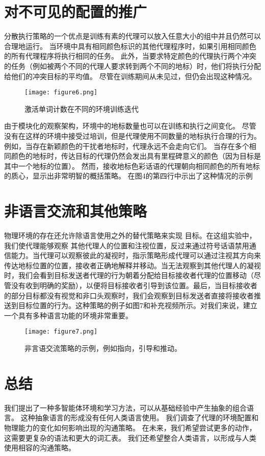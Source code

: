\section{对不可见的配置的推广}
分散执行策略的一个优点是训练有素的代理可以放入任意大小的组中并且仍然可以合理地运行。 当环境中具有相同颜色标识的其他代理程序时，如果引用相同颜色的所有代理程序将执行相同的任务。 此外，当要求特定颜色的代理执行两个冲突的任务（例如被两个不同的代理人要求转到两个不同的地标）时，他们将执行分配给他们的冲突目标的平均值。 尽管在训练期间从未见过，但仍会出现这种情况。

\begin{figure}[htb]
	\centering
	\texttt{[image: figure6.png]}
	\caption{激活单词计数在不同的环境训练迭代}\label{fig:不同环境训练迭代}
\end{figure}
由于模块化的观察架构，环境中的地标数量也可以在训练和执行之间变化。 尽管没有在这样的环境中接受过培训，但是代理使用不同数量的地标执行合理的行为。 例如，当存在新颖颜色的干扰者地标时，代理永远不会走向它们。 当存在多个相同颜色的地标时，传达目标的代理仍然会发出具有里程碑意义的颜色（因为目标是其中一个地标的位置）。 然而，接收地标色彩话语的代理朝向相同颜色的所有地标的质心，显示出非常明智的概括策略。 在图4的第四行中示出了这种情况的示例

\section{非语言交流和其他策略}
物理环境的存在还允许除语言使用之外的替代策略来实现
目标。在这组实验中，我们使代理能够观察
其他代理人的位置和注视位置，反过来通过符号话语禁用通信能力。当代理可以观察彼此的凝视时，指示策略形成代理可以通过注视其方向来传达地标位置的位置，接收者正确地解释并移动。当无法观察到其他代理人的凝视时，我们会看到目标发送者代理的行为朝着分配给目标接收者代理的位置移动（尽管没有收到明确的奖励），以便将目标接收者引导到该位置。最后，当目标接收者的部分目标都没有视觉和非口头观察时，我们会观察到目标发送者直接将接收者推送到目标位置的行为。这种策略的例子如图7和补充视频所示。对我们来说，建立一个具有多种语言功能的环境非常重要。

\begin{figure}[htb]
	\centering
	\texttt{[image: figure7.png]}
	\caption{非言语交流策略的示例，例如指向，引导和推动。}\label{fig:非言语交流策略的示例}
\end{figure}


\section{总结}
我们提出了一种多智能体环境和学习方法，可以从基础经验中产生抽象的组合语言。 这种抽象语言的形成没有任何人类语言使用。 我们调查了代理的环境配置和物理能力的变化如何影响出现的沟通策略。 在未来，我们希望尝试更多的动作，这需要更复杂的语法和更大的词汇表。 我们还希望整合人类语言，以形成与人类使用相容的沟通策略。

